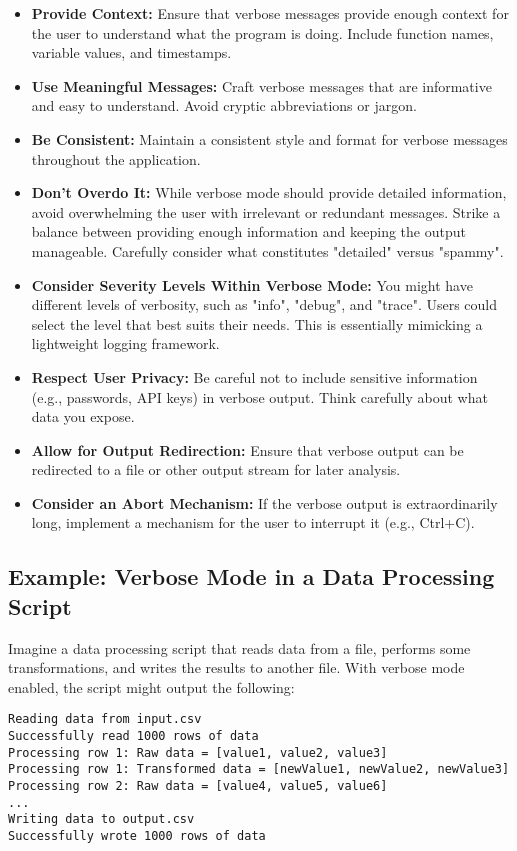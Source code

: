 \documentclass{article}
\begin{document}
{{{\begin{itemize}
    \item \textbf{Provide Context:}  Ensure that verbose messages provide enough context for the user to understand what the program is doing. Include function names, variable values, and timestamps.
    \item \textbf{Use Meaningful Messages:}  Craft verbose messages that are informative and easy to understand. Avoid cryptic abbreviations or jargon.
    \item \textbf{Be Consistent:}  Maintain a consistent style and format for verbose messages throughout the application.
    \item \textbf{Don't Overdo It:}  While verbose mode should provide detailed information, avoid overwhelming the user with irrelevant or redundant messages. Strike a balance between providing enough information and keeping the output manageable.  Carefully consider what constitutes "detailed" versus "spammy".
    \item \textbf{Consider Severity Levels Within Verbose Mode:} You might have different levels of verbosity, such as "info", "debug", and "trace". Users could select the level that best suits their needs. This is essentially mimicking a lightweight logging framework.
    \item \textbf{Respect User Privacy:} Be careful not to include sensitive information (e.g., passwords, API keys) in verbose output.  Think carefully about what data you expose.
    \item \textbf{Allow for Output Redirection:} Ensure that verbose output can be redirected to a file or other output stream for later analysis.
    \item \textbf{Consider an Abort Mechanism:} If the verbose output is extraordinarily long, implement a mechanism for the user to interrupt it (e.g., Ctrl+C).
\end{itemize}

\subsection*{Example: Verbose Mode in a Data Processing Script}

Imagine a data processing script that reads data from a file, performs some transformations, and writes the results to another file. With verbose mode enabled, the script might output the following:

\begin{verbatim}
Reading data from input.csv
Successfully read 1000 rows of data
Processing row 1: Raw data = [value1, value2, value3]
Processing row 1: Transformed data = [newValue1, newValue2, newValue3]
Processing row 2: Raw data = [value4, value5, value6]
...
Writing data to output.csv
Successfully wrote 1000 rows of data
\end{verbatim}

}}}
\end{document}
